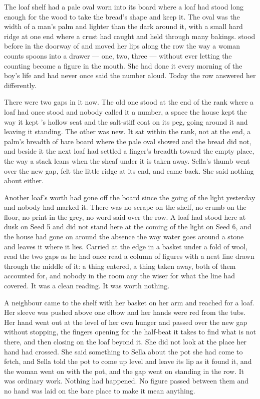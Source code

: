 
The loaf shelf had a pale oval worn into its board where a loaf had stood long enough for the wood to take the bread's shape and keep it. The oval was the width of a man's palm and lighter than the dark around it, with a small hard ridge at one end where a crust had caught and held through many bakings.  stood before  in the doorway of  and moved her lips along the row the way a woman counts spoons into a drawer --- one, two, three --- without ever letting the counting become a figure in the mouth. She had done it every morning of the boy's life and had never once said the number aloud. Today the row answered her differently.

There were two gaps in it now. The old one stood at the end of the rank where a loaf had once stood and nobody called it a number, a space the house kept the way it kept 's hollow seat and the salt-stiff coat on its peg, going around it and leaving it standing. The other was new. It sat within the rank, not at the end, a palm's breadth of bare board where the pale oval showed and the bread did not, and beside it the next loaf had settled a finger's breadth toward the empty place, the way a stack leans when the sheaf under it is taken away. Sella's thumb went over the new gap, felt the little ridge at its end, and came back. She said nothing about either.

Another loaf's worth had gone off the board since the going of the light yesterday and nobody had marked it. There was no scrape on the shelf, no crumb on the floor, no print in the grey, no word said over the row. A loaf had stood here at dusk on Seed 5 and did not stand here at the coming of the light on Seed 6, and the house had gone on around the absence the way water goes around a stone and leaves it where it lies. Carried at the edge in a basket under a fold of wool,  read the two gaps as he had once read a column of figures with a neat line drawn through the middle of it: a thing entered, a thing taken away, both of them accounted for, and nobody in the room any the wiser for what the line had covered. It was a clean reading. It was worth nothing.

A neighbour came to the shelf with her basket on her arm and reached for a loaf. Her sleeve was pushed above one elbow and her hands were red from the tubs. Her hand went out at the level of her own hunger and passed over the new gap without stopping, the fingers opening for the half-beat it takes to find what is not there, and then closing on the loaf beyond it. She did not look at the place her hand had crossed. She said something to Sella about the pot she had come to fetch, and Sella told the pot to come up level and leave its lip as it found it, and the woman went on with the pot, and the gap went on standing in the row. It was ordinary work. Nothing had happened. No figure passed between them and no hand was laid on the bare place to make it mean anything.

